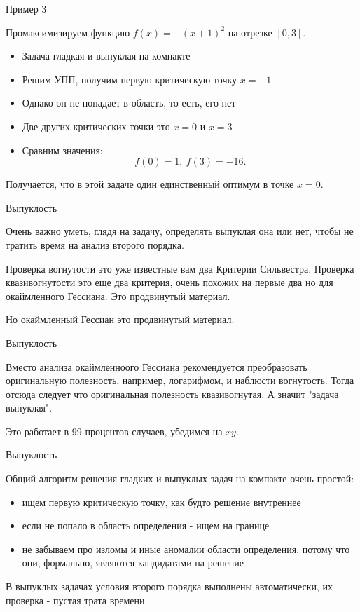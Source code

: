 \documentclass{beamer}
\begin{document}
\begin{frame}{Пример 3}

Промаксимизируем функцию $f(x) = -(x+1)^2$ на отрезке $[0,3]$.

\begin{itemize}
  \item Задача гладкая и выпуклая на компакте
  \item Решим УПП, получим первую критическую точку $x = -1$
  \item Однако он не попадает в область, то есть, его нет
  \item Две других критических точки это $x = 0$ и $x = 3$
  \item Сравним значения: $$f(0) = 1, \ f(3) = -16.$$
\end{itemize}

Получается, что в этой задаче один единственный оптимум в точке $x = 0$.

\end{frame}

\begin{frame}{Выпуклость}

Очень важно уметь, глядя на задачу, определять выпуклая она или нет, чтобы не тратить время на анализ второго порядка. 

Проверка вогнутости это уже известные вам два Критерии Сильвестра. Проверка квазивогнутости это еще два критерия, очень похожих на первые два но для окаймленного Гессиана. Это продвинутый материал. 

Но \alert{окаймленный Гессиан} это продвинутый материал.

\end{frame}

\begin{frame}{Выпуклость}

Вместо анализа окаймленноого Гессиана \alert{рекомендуется преобразовать оригинальную полезность, например, логарифмом, и наблюсти вогнутость}. Тогда отсюда следует что оригинальная полезность квазивогнутая. А значит "задача выпуклая".

Это работает в 99 процентов случаев, убедимся на $xy$.

\end{frame}


\begin{frame}{Выпуклость}

Общий алгоритм решения гладких и выпуклых задач на компакте очень простой:

\begin{itemize}
\item ищем первую критическую точку, как будто решение внутреннее
\item если не попало в область определения - ищем на границе
\item не забываем про изломы и иные аномалии области определения, потому что они, формально, являются кандидатами на решение
\end{itemize}

\alert{В выпуклых задачах условия второго порядка выполнены автоматически}, их проверка - пустая трата времени.

\end{frame}
\end{document}
